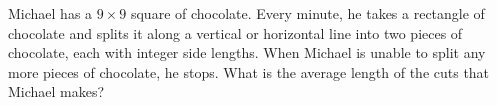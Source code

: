 Michael has a $9\times 9$ square of chocolate. Every minute, he takes a rectangle of chocolate and splits it along a vertical or horizontal line into two pieces of chocolate, each with integer side lengths. When Michael is unable to split any more pieces of chocolate, he stops. What is the average length of the cuts that Michael makes?
